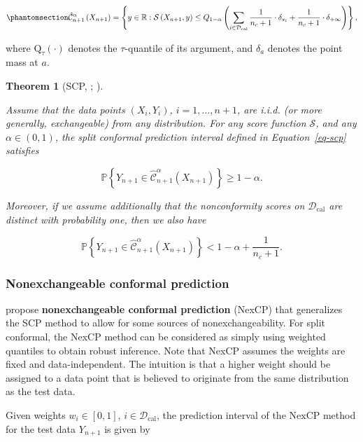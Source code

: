 \documentclass[
  11pt,
  a4paper,
]{article}
\theoremstyle{plain}
\newtheorem{theorem}{Theorem}[section]
\theoremstyle{plain}
\theoremstyle{remark}
\begin{document}
\begin{equation}\phantomsection\label{eq-scp}{
\hat{\mathcal{C}}_{n+1}^{\alpha}\left(X_{n+1}\right) = \left\{y\in\mathbb{R}: \mathcal{S}\left(X_{n+1}, y\right) \leq Q_{1-\alpha}\left(\sum_{i \in \mathcal{D}_{\text{cal}}}\frac{1}{n_c+1}\cdot\delta_{s_{i}}+\frac{1}{n_c+1}\cdot\delta_{+\infty}\right)\right\},
}\end{equation}

where \(\mathrm{Q}_\tau(\cdot)\) denotes the \(\tau\)-quantile of its
argument, and \(\delta_a\) denotes the point mass at \(a\).

\begin{theorem}[SCP, \textcite{vovk2005};
\textcite{lei2018}]\protect\hypertarget{thm-scp}{}\label{thm-scp}

Assume that the data points \((X_i, Y_i)\), \(i=1,\ldots,n+1\), are
i.i.d. (or more generally, exchangeable) from any distribution. For any
score function \(\mathcal{S}\), and any \(\alpha\in(0,1)\), the split
conformal prediction interval defined in Equation~\ref{eq-scp} satisfies

\[
\mathbb{P}\left\{Y_{n+1} \in \hat{\mathcal{C}}_{n+1}^{\alpha}\left(X_{n+1}\right)\right\} \geq 1-\alpha.
\]

Moreover, if we assume additionally that the nonconformity scores on
\(\mathcal{D}_{\text{cal}}\) are distinct with probability one, then we
also have

\[
\mathbb{P}\left\{Y_{n+1} \in \hat{\mathcal{C}}_{n+1}^{\alpha}\left(X_{n+1}\right)\right\} < 1-\alpha+\frac{1}{n_c+1}.
\]

\end{theorem}

\subsubsection{Nonexchangeable conformal
prediction}\label{nonexchangeable-conformal-prediction}

\textcite{barber2023} propose \textbf{nonexchangeable conformal
prediction} (NexCP) that generalizes the SCP method to allow for some
sources of nonexchangeability. For split conformal, the NexCP method can
be considered as simply using weighted quantiles to obtain robust
inference. Note that NexCP assumes the weights are fixed and
data-independent. The intuition is that a higher weight should be
assigned to a data point that is believed to originate from the same
distribution as the test data.

Given weights \(w_i \in [0,1]\), \(i \in \mathcal{D}_{\text{cal}}\), the
prediction interval of the NexCP method for the test data \(Y_{n+1}\) is
given by
\end{document}
